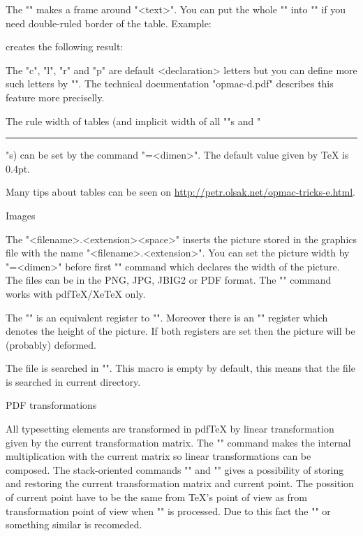 The "" makes a frame around "<text>". You can put the whole "\table"
into "\frame" if you need double-ruled border of the table. Example:

\begtt
{}
\endtt
%
creates the following result:

\hfil{}
\bigskip

The "c", "l", "r" and "p" are default <declaration> letters but you can define
more such letters by "\def\tabdeclare<letter>{<left>##<right>}". The
technical documentation "opmac-d.pdf" describes this feature more preciselly.

The rule width of tables (and implicit width of all "\vrule"s and "\hrule"s)
can be set by the command "=<dimen>". The default value given 
by \TeX{} is 0.4pt.

Many tips about tables can be seen on
\url{http://petr.olsak.net/opmac-tricks-e.html}.

\sec Images

The "\inspic <filename>.<extension><space>" inserts the picture stored in
the graphics file  with the name "<filename>.<extension>". 
You can set the picture width by "\picw=<dimen>" before first "\inspic" command
which declares the width of the picture. 
The files can be in the PNG, JPG, JBIG2 or PDF format. The "\inspic" command
works with pdf\TeX{}/Xe\TeX{} only.

The "\picwidth" is an equivalent register to "\picw". Moreover there is an
"\picheight" register which denotes the height of the picture. If both
registers are set then the picture will be (probably) deformed. 

The file is searched in "\picdir". This macro is empty by default, this
means that the file is searched in current directory.

\sec PDF transformations

All typesetting elements are transformed in pdf\TeX{} by linear
transformation given by the current transformation matrix. The
"" command makes the internal multiplication
with the current matrix so linear transformations can be composed. The
stack-oriented commands "\pdfsave" and "\pdfrestore" gives a possibility of
storing and restoring the current transformation matrix and current point.
The possition of current point have to be the same from \TeX{}'s point of
view as from transformation point of view when "\pdfrestore" is processed.
Due to this fact the "\pdfsave{}\pdfrestore" 
or something similar is recomeded.

